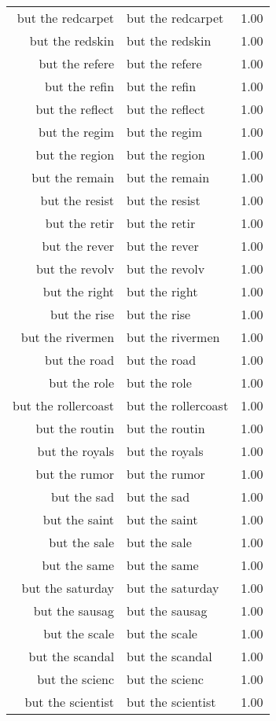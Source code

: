 \begin{table}[ht]
\begin{tabular}{rlr}
  but the redcarpet & but the redcarpet & 1.00 \\ 
  but the redskin & but the redskin & 1.00 \\ 
  but the refere & but the refere & 1.00 \\ 
  but the refin & but the refin & 1.00 \\ 
  but the reflect & but the reflect & 1.00 \\ 
  but the regim & but the regim & 1.00 \\ 
  but the region & but the region & 1.00 \\ 
  but the remain & but the remain & 1.00 \\ 
  but the resist & but the resist & 1.00 \\ 
  but the retir & but the retir & 1.00 \\ 
  but the rever & but the rever & 1.00 \\ 
  but the revolv & but the revolv & 1.00 \\ 
  but the right & but the right & 1.00 \\ 
  but the rise & but the rise & 1.00 \\ 
  but the rivermen & but the rivermen & 1.00 \\ 
  but the road & but the road & 1.00 \\ 
  but the role & but the role & 1.00 \\ 
  but the rollercoast & but the rollercoast & 1.00 \\ 
  but the routin & but the routin & 1.00 \\ 
  but the royals & but the royals & 1.00 \\ 
  but the rumor & but the rumor & 1.00 \\ 
  but the sad & but the sad & 1.00 \\ 
  but the saint & but the saint & 1.00 \\ 
  but the sale & but the sale & 1.00 \\ 
  but the same & but the same & 1.00 \\ 
  but the saturday & but the saturday & 1.00 \\ 
  but the sausag & but the sausag & 1.00 \\ 
  but the scale & but the scale & 1.00 \\ 
  but the scandal & but the scandal & 1.00 \\ 
  but the scienc & but the scienc & 1.00 \\ 
  but the scientist & but the scientist & 1.00 \\ 

\end{tabular}
\end{table}

